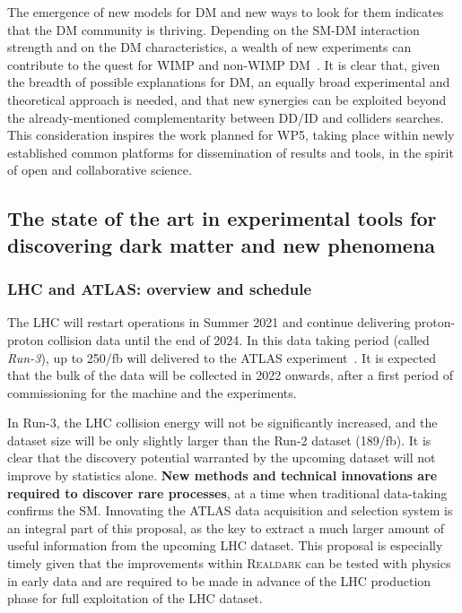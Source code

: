 The emergence of new models for DM and new ways to look for them indicates that the DM community is thriving.  
Depending on the SM-DM interaction strength and on the DM characteristics, a wealth of new experiments can contribute to the quest for WIMP and non-WIMP DM~\cite{Beacham:2019nyx,Bertone:2019irm,Barausse:2020rsu}. 
It is clear that, given the breadth of possible explanations for DM, an equally broad experimental and theoretical approach is needed, 
and that new synergies can be exploited beyond the already-mentioned complementarity between DD/ID and colliders searches. 
This consideration inspires the work planned for WP5, taking place within newly established common platforms for dissemination of results and tools, in the spirit of open and collaborative science. 

\subsection{The state of the art in experimental tools for discovering dark matter and new phenomena}
\label{sub:stateOfTheArtExperiment}

\subsubsection{LHC and ATLAS: overview and schedule}
\smallskip

The LHC will restart operations in Summer 2021 and continue delivering proton-proton collision data until the end of 2024. In this data taking period (called \textit{Run-3}), up to 250/fb will delivered to the ATLAS experiment~\cite{ATLAS2008}.%
It is expected that the bulk of the data will be collected in 2022 onwards, after a first period of commissioning for the machine and the experiments. 

In Run-3, the LHC collision energy will not be significantly increased, and the dataset size will be only slightly larger than the Run-2 dataset (189/fb). 
It is clear that the discovery potential warranted by the upcoming dataset will not improve by statistics alone. 
\textbf{New methods and technical innovations are required to discover rare processes}, at a time when traditional data-taking confirms the SM.%
Innovating the ATLAS data acquisition and selection system is an integral part of this proposal, 
as the key to extract a much larger amount of useful information from the upcoming LHC dataset. 
This proposal is especially timely given that the improvements within \textsc{Realdark} can be tested with physics in early data and are required to be made in advance of the LHC production phase for full exploitation of the LHC dataset. 

